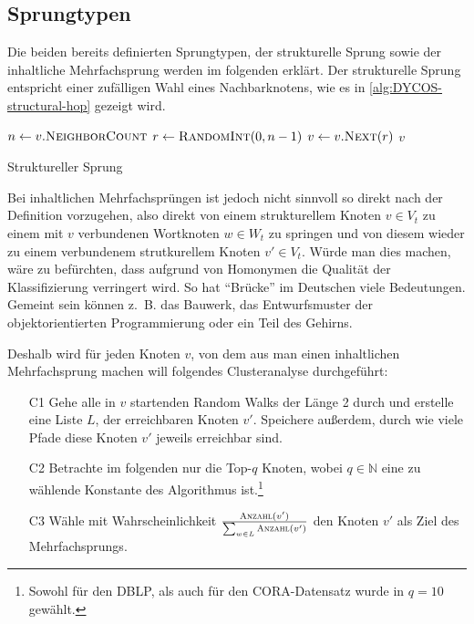 \subsection{Sprungtypen}\label{sec:sprungtypen}
Die beiden bereits definierten Sprungtypen, der strukturelle Sprung
sowie der inhaltliche Mehrfachsprung werden im folgenden erklärt.
\goodbreak
Der strukturelle Sprung entspricht einer zufälligen Wahl eines 
Nachbarknotens, wie es in \cref{alg:DYCOS-structural-hop}
gezeigt wird.
\begin{algorithm}[H]
    \begin{algorithmic}[1]
            \State $n \gets v.\Call{NeighborCount}{}$ 
            \State $r \gets \Call{RandomInt}{0, n-1}$ 
            \State $v \gets v.\Call{Next}{r}$ 
            \State \Return $v$
        \EndProcedure
    \end{algorithmic}
\caption{Struktureller Sprung}
\label{alg:DYCOS-structural-hop}
\end{algorithm}

Bei inhaltlichen Mehrfachsprüngen ist jedoch nicht sinnvoll so direkt
nach der Definition vorzugehen,  also
direkt von einem strukturellem Knoten 
$v \in V_t$ zu einem mit $v$ verbundenen Wortknoten $w \in W_t$ zu springen
und von diesem wieder zu einem verbundenem strutkurellem Knoten 
$v' \in V_t$. Würde man dies machen, wäre zu befürchten, dass
aufgrund von Homonymen die Qualität der Klassifizierung verringert
wird. So hat \enquote{Brücke} im Deutschen viele Bedeutungen.
Gemeint sein können z.~B. das Bauwerk, das Entwurfsmuster der
objektorientierten Programmierung oder ein Teil des Gehirns.

Deshalb wird für jeden Knoten $v$, von dem aus man einen inhaltlichen
Mehrfachsprung machen will folgendes Clusteranalyse durchgeführt:
\begin{enumerate}[label=C\arabic*),ref=C\arabic*]
    \item[C1] Gehe alle in $v$ startenden Random Walks der Länge 2 durch
          und erstelle eine Liste $L$, der erreichbaren Knoten $v'$. Speichere
          außerdem, durch wie viele Pfade diese Knoten $v'$ jeweils erreichbar sind.
    \item[C2] Betrachte im folgenden nur die Top-$q$ Knoten, wobei $q \in \mathbb{N}$
          eine zu wählende Konstante des Algorithmus ist.\footnote{Sowohl für den DBLP, als auch für den 
CORA-Datensatz wurde in \cite[S. 364]{aggarwal2011} $q=10$ gewählt.} \label{list:aggregate.2}
    \item[C3] Wähle mit Wahrscheinlichkeit $\frac{\Call{Anzahl}{v'}}{\sum_{w \in L} \Call{Anzahl}{v'}}$
          den Knoten $v'$ als Ziel des Mehrfachsprungs.
\end{enumerate}

